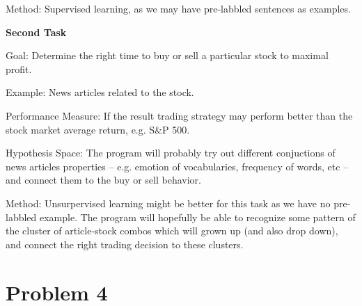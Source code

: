 \documentclass[12pt]{article}
\begin{document}
Method: Supervised learning, as we may have pre-labbled sentences as examples.\newline

\noindent\textbf{Second Task}

Goal: Determine the right time to buy or sell a particular stock to maximal profit.

Example: News articles related to the stock.

Performance Measure: If the result trading strategy may perform better than the stock market average return, e.g. S&P 500.

Hypothesis Space: The program will probably try out different conjuctions of news articles properties -- e.g. emotion of vocabularies, frequency of words, etc -- and connect them to the buy or sell behavior.

Method: Unsurpervised learning might be better for this task as we have no pre-labbled example. The program will hopefully be able to recognize some pattern of the cluster of article-stock combos which will grown up (and also drop down), and connect the right trading decision to these clusters.

\section{Problem 4}


% 
% 
\end{document}
